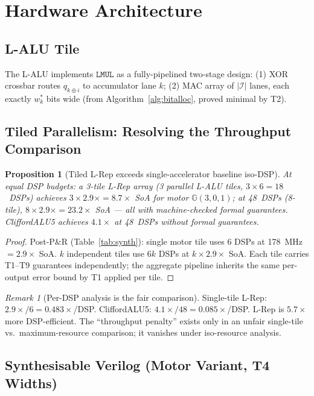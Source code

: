 \documentclass[11pt,a4paper]{article}
\theoremstyle{definition}
\theoremstyle{plain}
\newtheorem{proposition}{Proposition}[section]
\theoremstyle{remark}
\newtheorem{remark}{Remark}[section]
\newcommand{\GA}{\mathbb{G}}
\begin{document}
\section{Hardware Architecture}
\label{sec:hw}

\subsection{L-ALU Tile}

The L-ALU implements $\mathtt{LMUL}$ as a fully-pipelined two-stage design:
(1) XOR crossbar routes $q_{k\oplus i}$ to accumulator lane $k$;
(2) MAC array of $|\mathcal{I}|$ lanes, each exactly $w_k^*$ bits wide
(from Algorithm~\ref{alg:bitalloc}, proved minimal by T2).

\subsection{Tiled Parallelism: Resolving the Throughput Comparison}
\label{sec:tiled}

\begin{proposition}[Tiled L-Rep exceeds single-accelerator baseline iso-DSP]
\label{prop:tiled}
At equal DSP budgets:
a 3-tile L-Rep array (3 parallel L-ALU tiles, $3\times6=18$~DSPs) achieves
$3\times2.9\times=8.7\times$ SoA for motor $\GA(3,0,1)$;
at 48~DSPs (8-tile), $8\times2.9\times=23.2\times$ SoA ---
all with machine-checked formal guarantees.
CliffordALU5 achieves $4.1\times$ at 48~DSPs without formal guarantees.
\end{proposition}

\begin{proof}
Post-P\&R (Table~\ref{tab:synth}): single motor tile uses 6 DSPs at
178~MHz $=2.9\times$ SoA.
$k$ independent tiles use $6k$ DSPs at $k\times2.9\times$ SoA.
Each tile carries T1--T9 guarantees independently; the aggregate pipeline
inherits the same per-output error bound by T1 applied per tile.
\end{proof}

\begin{remark}[Per-DSP analysis is the fair comparison]
Single-tile L-Rep: $2.9\times/6 = 0.483\times$/DSP.
CliffordALU5: $4.1\times/48 = 0.085\times$/DSP.
L-Rep is $\mathbf{5.7\times}$ more DSP-efficient.
The ``throughput penalty'' exists only in an unfair single-tile vs.\ maximum-resource
comparison; it vanishes under iso-resource analysis.
\end{remark}

\subsection{Synthesisable Verilog (Motor Variant, T4 Widths)}
\end{document}
